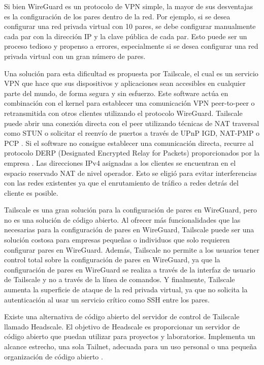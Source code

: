 \documentclass[letterpaper,12pt,oneside]{article}
\begin{document}
Si bien WireGuard es un protocolo de VPN simple, la mayor de sus desventajas es la configuración de los pares dentro de la red. Por ejemplo, si se desea configurar una red privada virtual con 10 pares, se debe configurar manualmente cada par con la dirección IP y la clave pública de cada par. Esto puede ser un proceso tedioso y propenso a errores, especialmente si se desea configurar una red privada virtual con un gran número de pares.

Una solución para esta dificultad es propuesta por Tailscale, el cual es un servicio VPN que hace que sus dispositivos y aplicaciones sean accesibles en cualquier parte del mundo, de forma segura y sin esfuerzo. Este software actúa en combinación con el kernel para establecer una comunicación VPN peer-to-peer o retransmitida con otros clientes utilizando el protocolo WireGuard. Tailscale puede abrir una conexión directa con el peer utilizando técnicas de NAT traversal como STUN o solicitar el reenvío de puertos a través de UPnP IGD, NAT-PMP o PCP \cite{tailscale_nat}. Si el software no consigue establecer una comunicación directa, recurre al protocolo DERP (Designated Encrypted Relay for Packets) proporcionados por la empresa \cite{tailscale_derp}. Las direcciones IPv4 asignadas a los clientes se encuentran en el espacio reservado NAT de nivel operador. Esto se eligió para evitar interferencias con las redes existentes \cite{tailscale_ip_pool} ya que el enrutamiento de tráfico a redes detrás del cliente es posible.

Tailscale es una gran solución para la configuración de pares en WireGuard, pero no es una solución de código abierto. Al ofrecer más funcionalidades que las necesarias para la configuración de pares en WireGuard, Tailscale puede ser una solución costosa para empresas pequeñas o individuos que solo requieren configurar pares en WireGuard. Además, Tailscale no permite a los usuarios tener control total sobre la configuración de pares en WireGuard, ya que la configuración de pares en WireGuard se realiza a través de la interfaz de usuario de Tailscale y no a través de la línea de comandos. Y finalmente, Tailscale aumenta la superficie de ataque de la red privada virtual, ya que no solicita la autenticación al usar un servicio crítico como SSH entre los pares.

Existe una alternativa de código abierto del servidor de control de Tailscale llamado Headscale. El objetivo de Headscale es proporcionar un servidor de código abierto que puedan utilizar para proyectos y laboratorios. Implementa un alcance estrecho, una sola Tailnet, adecuada para un uso personal o una pequeña organización de código abierto \cite{headscale}.
\end{document}
